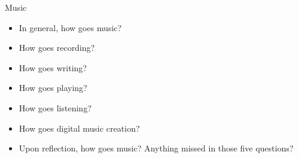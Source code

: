 
		\item Music
		\begin{itemize}
			\item In general, how goes music?

			\item How goes recording?

			\item How goes writing?

			\item How goes playing?

			\item How goes listening?

			\item How goes digital music creation?

			\item Upon reflection, how goes music? Anything missed in those five questions?

		\end{itemize}

